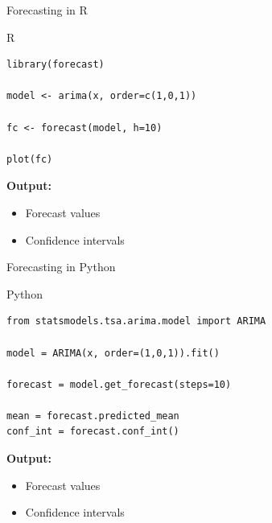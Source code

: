 \documentclass[aspectratio=169]{beamer}
\begin{document}
\begin{frame}[fragile]{Forecasting in R}
\small

\begin{block}{R}
\begin{verbatim}
library(forecast)

model <- arima(x, order=c(1,0,1))

fc <- forecast(model, h=10)

plot(fc)
\end{verbatim}
\end{block}

\vspace{0.3cm}

\textbf{Output:}
\begin{itemize}
    \item Forecast values
    \item Confidence intervals
\end{itemize}

\end{frame}

\begin{frame}[fragile]{Forecasting in Python}
\small

\begin{block}{Python}
\begin{verbatim}
from statsmodels.tsa.arima.model import ARIMA

model = ARIMA(x, order=(1,0,1)).fit()

forecast = model.get_forecast(steps=10)

mean = forecast.predicted_mean
conf_int = forecast.conf_int()
\end{verbatim}
\end{block}

\vspace{0.3cm}

\textbf{Output:}
\begin{itemize}
    \item Forecast values
    \item Confidence intervals
\end{itemize}

\end{frame}
\end{document}
